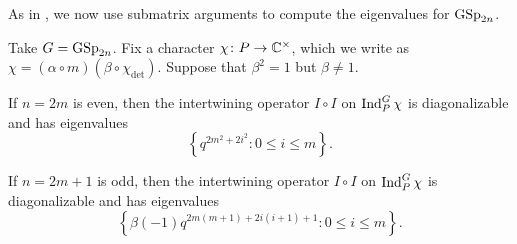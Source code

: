 As in , we now use submatrix arguments to compute the eigenvalues for $\mathrm{GSp}_{2n}$.
\begin{theorem}
    Take $G=\mathrm{GSp}_{2n}$. Fix a character $\chi\colon P\to\mathbb C^\times$, which we write as $\chi=(\alpha\circ m)(\beta\circ\chi_{\det})$. Suppose that $\beta^2=1$ but $\beta\ne1$.
    \begin{listalph}
        \item If $n=2m$ is even, then the intertwining operator $I\circ I$ on $\operatorname{Ind}_P^G\chi$ is diagonalizable and has eigenvalues
        \[\left\{q^{2m^2+2i^2}:0\le i\le m\right\}.\]
        \item If $n=2m+1$ is odd, then the intertwining operator $I\circ I$ on $\operatorname{Ind}_P^G\chi$ is diagonalizable and has eigenvalues
        \[\left\{\beta(-1)q^{2m(m+1)+2i(i+1)+1}:0\le i\le m\right\}.\]
    \end{listalph}
\end{theorem}
